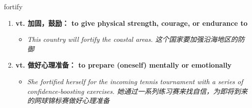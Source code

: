 
\begin{frame}
{\huge fortify}
\begin{center}
\begin{enumerate}\Large
  \item \textbf{vt. 加固，鼓励： to give physical strength, courage, or endurance to}
  \begin{itemize}
    \item \em{\Large{This country will fortify the coastal areas. 这个国家要加强沿海地区的防御}}
  \end{itemize}
  \item \textbf{vt. 做好心理准备： to prepare (oneself) mentally or emotionally}
  \begin{itemize}
    \item \em{\Large{She fortified herself for the incoming tennis tournament with a series of confidence-boosting exercises. 她通过一系列练习赛来找自信，为即将到来的网球锦标赛做好心理准备}}
  \end{itemize}
\end{enumerate}
\end{center}
\end{frame}
